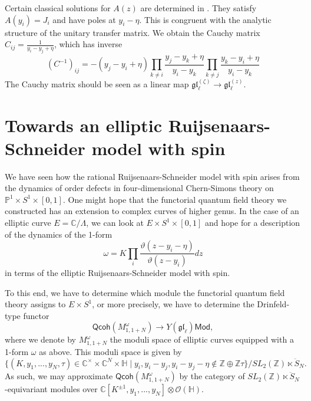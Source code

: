 \documentclass[11pt]{report}
\theoremstyle{definition}
\theoremstyle{remark}
\theoremstyle{remark}
\newcommand{\Z}{\mathbb{Z}}
\newcommand{\C}{\mathbb{C}}
\renewcommand{\P}{\mathbb{P}}
\begin{document}
Certain classical solutions for $A(z)$ are determined in \cite{article:lacroix:2021}. They satisfy $A(y_i) = J_i$ and have poles at $y_i-\eta$. This is congruent with the analytic structure of the unitary transfer matrix. We obtain the Cauchy matrix $C_{ij} = \frac{1}{y_i-y_j+\eta}$, which has inverse
\begin{equation*}
(C^{-1})_{ij} = -(y_j-y_i+\eta) \prod_{k \neq i} \frac{y_j-y_k+\eta}{y_i-y_k} \prod_{k \neq j} \frac{y_k-y_i+\eta}{y_i-y_k}
\end{equation*}
The Cauchy matrix should be seen as a linear map $\mathfrak{gl}_\ell^{(\zeta)} \to \mathfrak{gl}_\ell^{(z)}$.

\section{Towards an elliptic Ruijsenaars-Schneider model with spin}

We have seen how the rational Ruijsenaars-Schneider model with spin arises from the dynamics of order defects in four-dimensional Chern-Simons theory on $\P^1 \times S^1 \times [0,1]$. One might hope that the functorial quantum field theory we constructed has an extension to complex curves of higher genus. In the case of an elliptic curve $E = \C/\Lambda$, we can look at $E \times S^1 \times [0,1]$ and hope for a description of the dynamics of the 1-form
\begin{equation*}
\omega = K \prod_i \frac{\vartheta(z-y_i-\eta)}{\vartheta(z-y_i)} dz
\end{equation*}
in terms of the elliptic Ruijsenaars-Schneider model with spin.

To this end, we have to determine which module the functorial quantum field theory assigns to $E \times S^1$, or more precisely, we have to determine the Drinfeld-type functor
\begin{equation*}
\mathsf{Qcoh}(M_{1,1+N}^\omega) \to Y(\mathfrak{gl}_\ell)\mathsf{Mod},
\end{equation*}
where we denote by $M_{1,1+N}^\omega$ the moduli space of elliptic curves equipped with a 1-form $\omega$ as above. This moduli space is given by
\begin{equation*}
\{ (K,y_1,...,y_N,\tau) \in \C^\times \times \C^N \times \mathbb{H} \mid y_i,y_i-y_j,y_i-y_j-\eta \notin \Z \oplus \Z \tau \}/SL_2(\Z) \ltimes \ddot S_N.
\end{equation*}
As such, we may approximate $\mathsf{Qcoh}(M_{1,1+N}^\omega)$ by the category of $SL_2(\Z) \ltimes \ddot S_N$-equivariant modules over $\C[K^{\pm 1},y_1,...,y_N] \otimes \mathcal{O}(\mathbb{H})$. 
\end{document}
